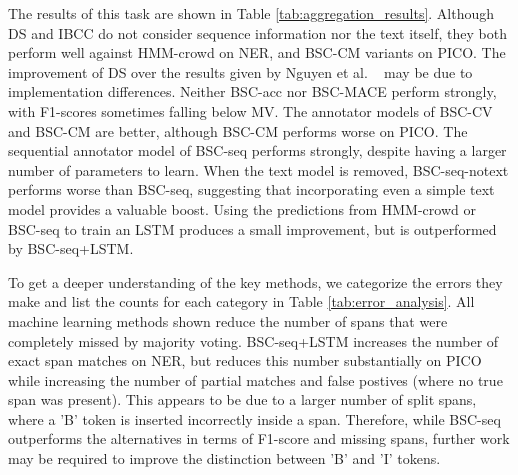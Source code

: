 The results of this task are shown in Table \ref{tab:aggregation_results}.
Although DS and IBCC do not consider sequence information nor the text itself, 
they both perform well against HMM-crowd on NER,
and BSC-CM variants on PICO. 
The improvement of DS over the results given 
by Nguyen et al. ~ may be due to implementation differences. 
Neither BSC-acc nor BSC-MACE perform strongly, with F1-scores sometimes falling below MV. 
The annotator models of BSC-CV and BSC-CM are better, although BSC-CM performs worse on PICO.
The sequential annotator model of BSC-seq performs strongly, despite
having a larger number of parameters to learn.
When the text model is removed, BSC-seq-notext performs worse than BSC-seq,
suggesting that incorporating even a simple text model provides 
a valuable boost.
Using the predictions from HMM-crowd or BSC-seq to train an LSTM produces a small improvement, but is outperformed by BSC-seq+LSTM.

To get a deeper understanding of the key methods, we categorize the errors they make and list the
counts for each category in Table \ref{tab:error_analysis}.
All machine learning methods shown reduce the number of spans that were completely missed by majority
voting. 
BSC-seq+LSTM increases the number of exact span matches on NER, but reduces this number substantially on PICO
while increasing the number of partial matches and false postives (where no true span was present). 
This appears to be due to a larger number of split spans, where a 'B' token is inserted incorrectly inside
a span. 
Therefore, while BSC-seq outperforms the alternatives in terms of F1-score and missing spans, 
further work may be required to improve the distinction between 'B' and 'I' tokens. 

